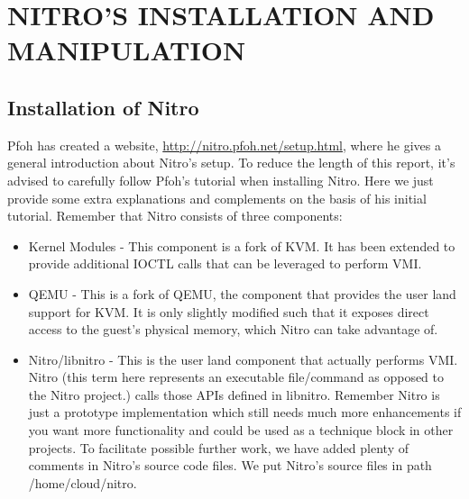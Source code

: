 
\chapter{NITRO'S INSTALLATION AND MANIPULATION} %

\label{Chapter6} %



\section{Installation of Nitro}

Pfoh has created a website, \url{http://nitro.pfoh.net/setup.html}, where he gives a general introduction about Nitro’s setup. To reduce the length of this 
report, it’s advised to carefully follow Pfoh’s tutorial when installing Nitro. Here we just provide some extra explanations and complements on the basis 
of his initial tutorial. Remember that Nitro consists of three components:
\begin{itemize}
    \item Kernel Modules - This component is a fork of KVM. It has been extended to provide additional IOCTL calls that can be leveraged to perform VMI.
    \item QEMU - This is a fork of QEMU, the component that provides the user land support for KVM. It is only slightly modified such that it exposes direct access to the guest's physical memory, which Nitro can take advantage of.
    \item Nitro/libnitro - This is the user land component that actually performs VMI. Nitro (this term here represents an executable file/command as opposed to the Nitro project.) calls those APIs defined in libnitro. Remember Nitro is just a prototype implementation which still needs much more enhancements if you want more functionality and could be used as a technique block in other projects. To facilitate possible further work, we have added plenty of comments in Nitro’s source code files. We put Nitro’s source files in path /home/cloud/nitro.
\end{itemize}

